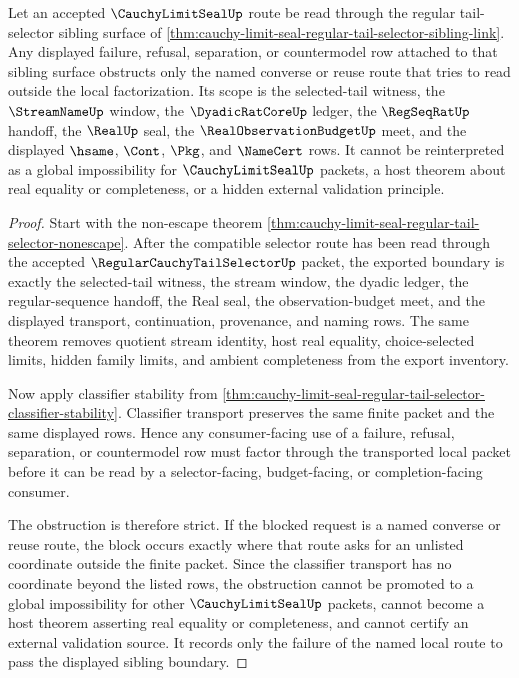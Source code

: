 \begin{corollary}
\label{cor:cauchy-limit-seal-regular-tail-selector-strict-local-obstruction}
Let an accepted $\CauchyLimitSealUp$ route be read through the regular tail-selector sibling surface of \autoref{thm:cauchy-limit-seal-regular-tail-selector-sibling-link}. Any displayed failure, refusal, separation, or countermodel row attached to that sibling surface obstructs only the named converse or reuse route that tries to read outside the local factorization. Its scope is the selected-tail witness, the $\StreamNameUp$ window, the $\DyadicRatCoreUp$ ledger, the $\RegSeqRatUp$ handoff, the $\RealUp$ seal, the $\RealObservationBudgetUp$ meet, and the displayed $\hsame$, $\Cont$, $\Pkg$, and $\NameCert$ rows. It cannot be reinterpreted as a global impossibility for $\CauchyLimitSealUp$ packets, a host theorem about real equality or completeness, or a hidden external validation principle.
\end{corollary}
\begin{proof}
Start with the non-escape theorem \autoref{thm:cauchy-limit-seal-regular-tail-selector-nonescape}. After the compatible selector route has been read through the accepted $\RegularCauchyTailSelectorUp$ packet, the exported boundary is exactly the selected-tail witness, the stream window, the dyadic ledger, the regular-sequence handoff, the Real seal, the observation-budget meet, and the displayed transport, continuation, provenance, and naming rows. The same theorem removes quotient stream identity, host real equality, choice-selected limits, hidden family limits, and ambient completeness from the export inventory.

Now apply classifier stability from \autoref{thm:cauchy-limit-seal-regular-tail-selector-classifier-stability}. Classifier transport preserves the same finite packet and the same displayed rows. Hence any consumer-facing use of a failure, refusal, separation, or countermodel row must factor through the transported local packet before it can be read by a selector-facing, budget-facing, or completion-facing consumer.

The obstruction is therefore strict. If the blocked request is a named converse or reuse route, the block occurs exactly where that route asks for an unlisted coordinate outside the finite packet. Since the classifier transport has no coordinate beyond the listed rows, the obstruction cannot be promoted to a global impossibility for other $\CauchyLimitSealUp$ packets, cannot become a host theorem asserting real equality or completeness, and cannot certify an external validation source. It records only the failure of the named local route to pass the displayed sibling boundary.
\end{proof}
